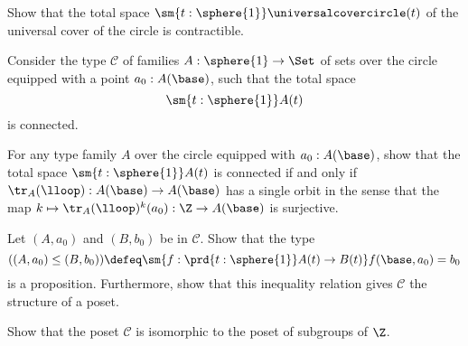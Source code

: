 \begin{exercises}
\begin{subexenum}
\begin{equation*}
    \end{equation*}
  \item Show that the total space $\sm{t:\sphere{1}}\universalcovercircle(t)$ of the universal cover of the circle is contractible.
  \end{subexenum}
  \exitem Consider the type $\mathcal{C}$ of families $A:\sphere{1}\to\Set$ of sets over the circle equipped with a point $a_0:A(\base)$, such that the total space
  \begin{equation*}
    \sm{t:\sphere{1}}A(t)
  \end{equation*}
  is connected.
  \begin{subexenum}
  \item For any type family $A$ over the circle equipped with $a_0:A(\base)$, show that the total space $\sm{t:\sphere{1}}A(t)$ is connected if and only if $\tr_A(\lloop):A(\base)\to A(\base)$ has a single orbit in the sense that the map $k\mapsto \tr_A(\lloop)^k(a_0):\Z\to A(\base)$ is surjective. 
  \item Let $(A,a_0)$ and $(B,b_0)$ be in $\mathcal{C}$. Show that the type
    \begin{equation*}
      ((A,a_0)\leq (B,b_0))\defeq \sm{f:\prd{t:\sphere{1}}A(t)\to B(t)}f(\base,a_0)=b_0
    \end{equation*}
    is a proposition. Furthermore, show that this inequality relation gives $\mathcal{C}$ the structure of a poset.
  \item Show that the poset $\mathcal{C}$ is isomorphic to the poset of subgroups of $\Z$.
  \end{subexenum}
\end{exercises}


